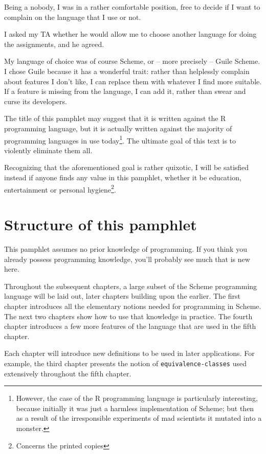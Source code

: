 Being a nobody, I was in a rather comfortable position, free
to decide if I want to complain on the language that I use or not.

I asked my TA whether he would allow me to choose
another language for doing the assignments, and he agreed.

My language of choice was of course Scheme, or -- more precisely --
Guile Scheme. I chose Guile because it has a wonderful trait:
rather than helplessly complain about features I don't like, I can
replace them with whatever I find more suitable. If a feature is
missing from the language, I can add it, rather than swear and curse
its developers.

The title of this pamphlet may suggest that it is written against
the R programming language, but it is actually written against the
majority of programming languages in use today\footnote{
However, the case of the R programming language is particularly
interesting, because initially it was just a harmless implementation
of Scheme; but then as a result of the irresponsible experiments
of mad scientists it mutated into a monster\cite{Ihaka2010}.}.
The ultimate goal of this text is to violently eliminate them all.

Recognizing that the aforementioned goal is rather quixotic, I will
be satisfied instead if anyone finds any value in
this pamphlet, whether it be education, entertainment or personal
hygiene\footnote{Concerns the printed copies}.

\section*{Structure of this pamphlet}
This pamphlet assumes no prior knowledge of programming.
If you think you already possess programming knowledge,
you'll probably see much that is new here.

Throughout the subsequent chapters, a large subset of the Scheme
programming language will be laid out, later chapters building
upon the earlier.
The first chapter introduces all the elementary notions needed
for programming in Scheme. The next two chapters show how to use that
knowledge in practice. The fourth chapter introduces a few
more features of the language that are used in the fifth
chapter.

Each chapter will introduce new definitions to be used
in later applications. For example, the third chapter presents
the notion of \texttt{equi\-valence\--classes} used
extensively throughout the fifth chapter.

